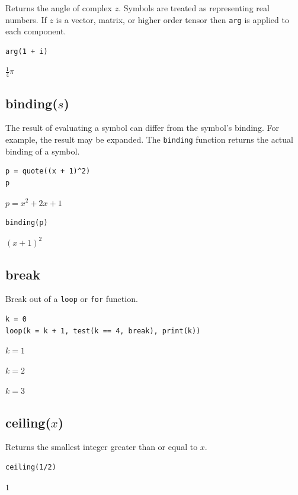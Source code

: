 Returns the angle of complex $z$.
Symbols are treated as representing real numbers.
If $z$ is a vector, matrix, or higher order tensor then
\verb$arg$ is applied to each component.

{\color{blue}
\begin{verbatim}
arg(1 + i)
\end{verbatim}
}

$\tfrac{1}{4}\pi$

\subsection*{binding($s$)}

The result of evaluating a symbol can differ from the symbol's binding.
For example, the result may be expanded.
The {\tt binding} function returns the actual binding of a symbol.

{\color{blue}
\begin{verbatim}
p = quote((x + 1)^2)
p
\end{verbatim}
}

$p=x^2+2x+1$

{\color{blue}
\begin{verbatim}
binding(p)
\end{verbatim}
}

$(x+1)^2$

\subsection*{break}

Break out of a \verb$loop$ or \verb$for$ function.

{\color{blue}
\begin{verbatim}
k = 0
loop(k = k + 1, test(k == 4, break), print(k))
\end{verbatim}
}

$k=1$

$k=2$

$k=3$

\subsection*{ceiling($x$)}

Returns the smallest integer greater than or equal to $x$.

{\color{blue}
\begin{verbatim}
ceiling(1/2)
\end{verbatim}
}

$1$


